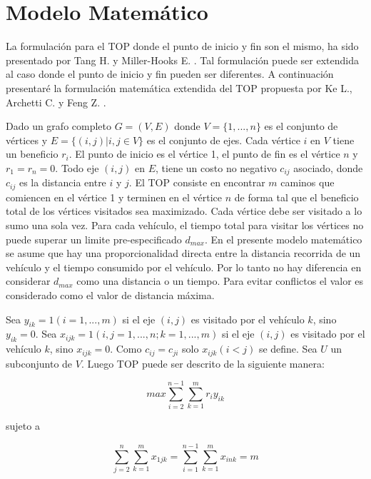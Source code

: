 \chapter{Modelo Matemático}

La formulación para el TOP donde el punto de inicio y fin son el mismo, ha sido presentado por Tang H. y Miller-Hooks E. \cite{TangMillerHooks}. Tal formulación puede ser extendida al caso donde el punto de inicio y fin pueden ser diferentes. A continuación presentaré la formulación matemática extendida del TOP propuesta por Ke L., Archetti C. y Feng Z. \cite{KeArchettiFeng}.

\bigskip

Dado un grafo completo $G=(V,E)$ donde $V=\{1,...,n\}$ es el conjunto de vértices y $E=\{(i,j)|i,j \in V\}$ es el conjunto de ejes. Cada vértice $i$ en $V$ tiene un beneficio $r_i$. El punto de inicio es el vértice 1, el punto de fin es el vértice $n$ y $r_1=r_n=0$. Todo eje $(i,j)$ en $E$, tiene un costo no negativo $c_{ij}$ asociado, donde $c_{ij}$ es la distancia entre $i$ y $j$. El TOP consiste en encontrar $m$ caminos que comiencen en el vértice 1 y terminen en el vértice $n$ de forma tal que el beneficio total de los vértices visitados sea maximizado. Cada vértice debe ser visitado a lo sumo una sola vez. Para cada vehículo, el tiempo total para visitar los vértices no puede superar un limite pre-especificado $d_{max}$. En el presente modelo matemático se asume que hay una proporcionalidad directa entre la distancia recorrida de un vehículo y el tiempo consumido por el vehículo. Por lo tanto no hay diferencia en considerar $d_{max}$ como una distancia o un tiempo. Para evitar conflictos el valor es considerado como el valor de distancia máxima.

\bigskip

Sea $y_{ik} = 1 (i = 1,...,m)$ si el eje $(i,j)$ es visitado por el vehículo $k$, sino $y_{ik} = 0$. Sea $x_{ijk} = 1 (i,j = 1,...,n; k=1,...,m)$ si el eje $(i,j)$ es visitado por el vehículo $k$, sino $x_{ijk} = 0$. Como $c_{ij}=c_{ji}$ solo $x_{ijk}(i<j)$ se define. Sea $U$ un subconjunto de $V$. Luego TOP puede ser descrito de la siguiente manera:

\bigskip

\begin{equation}
max \sum_{i=2}^{n-1} \sum_{k=1}^{m} r_i y_{ik}
\end{equation}

sujeto a

\begin{equation} \label{eq:modelo2}
\sum_{j=2}^{n} \sum_{k=1}^{m} x_{1jk} = \sum_{i=1}^{n-1} \sum_{k=1}^{m} x_{ink} = m
\end{equation}

